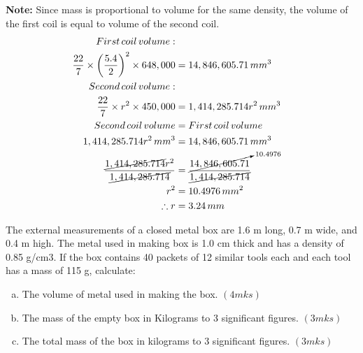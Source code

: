 \documentclass[
  letterpaper,
  DIV=11,
  numbers=noendperiod]{scrreprt}
\begin{document}
\begin{tcolorbox}[enhanced jigsaw, leftrule=.75mm, opacityback=0, toprule=.15mm, bottomrule=.15mm, breakable, title=\textcolor{quarto-callout-caution-color}{\faFire}\hspace{0.5em}{Solution}, opacitybacktitle=0.6, titlerule=0mm, colframe=quarto-callout-caution-color-frame, rightrule=.15mm, coltitle=black, colback=white, bottomtitle=1mm, toptitle=1mm, left=2mm, colbacktitle=quarto-callout-caution-color!10!white, arc=.35mm]

\textbf{Note:} Since mass is proportional to volume for the same
density, the volume of the first coil is equal to volume of the second
coil. \[
\begin{align*}
First\, coil \,volume:\\
\frac{22}{7}\times \left(\frac{5.4}{2}\right)^2\times 648,000&=14,846,605.71 \,mm^3\\
Second \,coil \,volume:\\
\frac{22}{7}\times r^2\times 450,000&=1,414,285.714r^2 \,mm^3\\
Second \,coil \,volume&=First\, coil \,volume\\
1,414,285.714r^2 \,mm^3&=14,846,605.71 \,mm^3\\
\frac{\cancel{1,414,285.714}r^2}
{\cancel{1,414,285.714}}&=\frac{\cancelto{10.4976}{14,846,605.71}}{\cancel{1,414,285.714}}\\r^2&=10.4976 \,mm^2\\
\therefore r&=3.24\, mm
\end{align*}
\]

\end{tcolorbox}

\begin{tcolorbox}[enhanced jigsaw, leftrule=.75mm, opacityback=0, toprule=.15mm, bottomrule=.15mm, breakable, title=\textcolor{quarto-callout-note-color}{\faInfo}\hspace{0.5em}{Example 3}, opacitybacktitle=0.6, titlerule=0mm, colframe=quarto-callout-note-color-frame, rightrule=.15mm, coltitle=black, colback=white, bottomtitle=1mm, toptitle=1mm, left=2mm, colbacktitle=quarto-callout-note-color!10!white, arc=.35mm]

The external measurements of a closed metal box are 1.6 m long, 0.7 m
wide, and 0.4 m high. The metal used in making box is 1.0 cm thick and
has a density of 0.85 g/cm3. If the box contains 40 packets of 12
similar tools each and each tool has a mass of 115 g, calculate:

\begin{enumerate}[(a)]
\item The volume of metal used in making the box.   \hspace{7cm}        $(4mks)$
\item The mass of the empty box in Kilograms to 3 significant figures.      \hspace{4cm}    $(3mks)$
\item The total mass of the box in kilograms to 3 significant figures.      \hspace{4.5cm}      $(3mks)$
\end{enumerate}

\end{tcolorbox}
\end{document}
